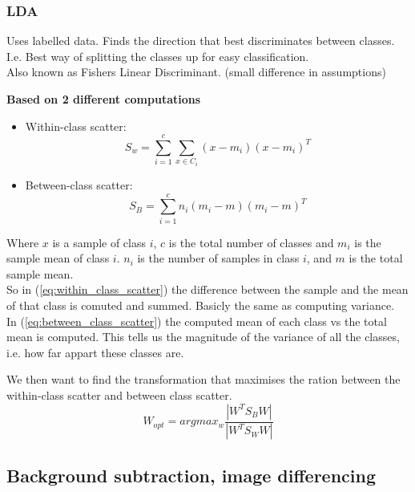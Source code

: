 \documentclass[a4paper]{article}
\begin{document}
\subsubsection{LDA}
Uses labelled data. Finds the direction that best discriminates between classes. I.e. Best way of splitting the classes up for easy classification. \\
Also known as Fishers Linear Discriminant. (small difference in assumptions)

\textbf{Based on 2 different computations} 
\begin{itemize}
	\item Within-class scatter:
	\begin{equation}\label{eq:within_class_scatter}
		S_w = \sum_{i=1}^{c}{\sum_{x \in C_i}^{}{(x-m_i)(x-m_i)^{T} }}
	\end{equation}
	\item Between-class scatter:
	\begin{equation}\label{eq:between_class_scatter}
	S_B = \sum_{i=1}^{c}{n_i(m_i - m)(m_i - m)^{T} }
	\end{equation}
\end{itemize}
Where $ x $ is a sample of class $ i $, $ c $ is the total number of classes and $ m_i $ is the sample mean of class $ i $. $ n_i $ is the number of samples in class $ i $, and $ m $ is the total sample mean. \\
So in (\ref{eq:within_class_scatter}) the difference between the sample and the mean of that class is comuted and summed. Basicly the same as computing variance. \\ 
In (\ref{eq:between_class_scatter}) the computed mean of each class vs the total mean is computed. This tells us the magnitude of the variance of all the classes, i.e. how far appart these classes are. 

We then want to find the transformation that maximises the ration between the within-class scatter and between class scatter. 
\begin{equation}
	W_{opt} = argmax_w  \frac{|W^{T} S_B W|}{|W^{T} S_W W|} 
\end{equation}


\newpage
\subsection{Background subtraction, image differencing}
\end{document}
